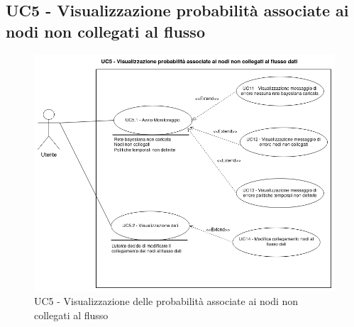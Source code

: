 \newpage

\subsection{UC5 - Visualizzazione probabilità associate ai nodi non collegati al flusso}\label{UC5}

\begin{figure}[H]
\centering
\includegraphics[scale=0.4]{./images/UC5.png}
\caption{UC5 - Visualizzazione delle probabilità associate ai nodi non collegati al flusso}
\end{figure}

